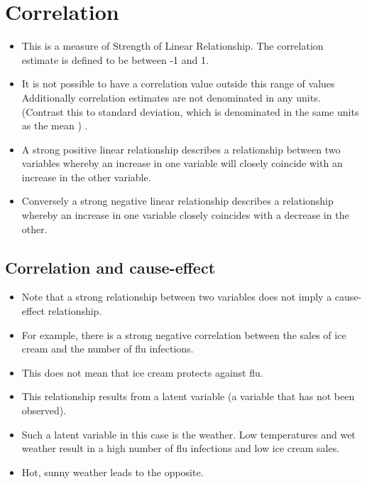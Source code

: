 \documentclass[]{report}
\begin{document}


\section{Correlation}
\begin{itemize}
	\item This is a measure of Strength of Linear Relationship.
	The correlation estimate is defined to be between -1 and 1.
	\item It is not possible to have a correlation value outside this range of values
	Additionally correlation estimates are not denominated in any units. (Contrast this to standard deviation, which is denominated in the same units as the mean ) .
	\item A strong positive linear relationship describes a relationship between two variables whereby an increase in one variable will closely coincide with an increase in the other variable.
	\item Conversely a strong negative linear relationship describes a relationship whereby an increase in one variable closely coincides with a decrease in the other.
\end{itemize}


\subsection{Correlation and cause-effect}
\begin{itemize}
	\item Note that a strong relationship between two variables does not
	imply a cause-effect relationship.
	\item For example, there is a strong negative correlation between the
	sales of ice cream and the number of flu infections.
	\item This does not mean that ice cream protects against flu.
	\item This relationship results from a latent variable (a variable that has
	not been observed).
	\item Such a latent variable in this case is the weather. Low
	temperatures and wet weather result in a high number of flu
	infections and low ice cream sales. \item Hot, sunny weather leads to the
	opposite.
\end{itemize}
\end{document}
